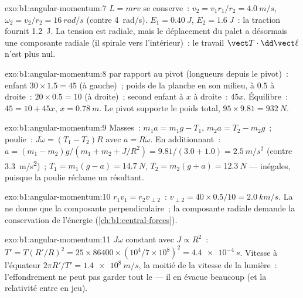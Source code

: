 \begin{solution}{exo:b1:angular-momentum:7}
$L = mrv$ se conserve~: $v_2 = v_1r_1/r_2 = \qty{4.0}{m/s}$, $\omega_2 = v_2/r_2
= \qty{16}{rad/s}$ (contre \qty{4}{rad/s}). $E_1 = \qty{0.40}{J}$, $E_2 =
\qty{1.6}{J}$~: la traction fournit \qty{1.2}{J}. La tension est radiale,
mais le déplacement du palet a désormais une composante radiale (il
spirale vers l'intérieur)~: le travail $\vect T\cdot\dd\vect\ell$ n'est plus nul.
\end{solution}

\begin{solution}{exo:b1:angular-momentum:8}
 par rapport au pivot (longueurs depuis le pivot)~: enfant $30 \times 1.5 =
45$ (à gauche)~; poids de la planche en son milieu, à $0.5$ à droite~: $20 \times
0.5 = 10$ (à droite)~; second enfant à $x$ à droite~: $45x$. Équilibre~:
$45 = 10 + 45x$, $x = \qty{0.78}{m}$. Le pivot supporte le poids total,
$95 \times 9.81 = \qty{932}{N}$.
\end{solution}

\begin{solution}{exo:b1:angular-momentum:9}
Masses~: $m_1a = m_1g - T_1$, $m_2a = T_2 - m_2g$~; poulie~: $J\dot\omega =
(T_1 - T_2)R$ avec $a = R\dot\omega$. En additionnant~: $a = (m_1 - m_2)g/(m_1 + m_2 +
J/R^2) = 9.81/(3.0 + 1.0) = \qty{2.5}{m/s^2}$ (contre \qty{3.3}{m/s^2})~;
$T_1 = m_1(g - a) = \qty{14.7}{N}$, $T_2 = m_2(g + a) = \qty{12.3}{N}$ ---
inégales, puisque la poulie réclame un  résultant.
\end{solution}

\begin{solution}{exo:b1:angular-momentum:10}
$r_1v_1 = r_2v_{\perp 2}$~: $v_{\perp 2} = 40 \times 0.5/10 = \qty{2.0}{km/s}$.
La  ne donne que la composante perpendiculaire~; la
composante radiale demande la conservation de l'énergie (\cref{ch:b1:central-forces}).
\end{solution}

\begin{solution}{exo:b1:angular-momentum:11}
$J\omega$ constant avec $J \propto R^2$~: $T' = T(R'/R)^2 = 25 \times 86400
\times (10^4/7\times10^8)^2 = \qty{4.4e-4}{s}$. Vitesse à l'équateur $2\pi R'/T'
= \qty{1.4e8}{m/s}$, la moitié de la vitesse de la lumière~: l'effondrement
ne peut pas garder tout le  --- il en évacue beaucoup (et
la relativité entre en jeu).
\end{solution}

